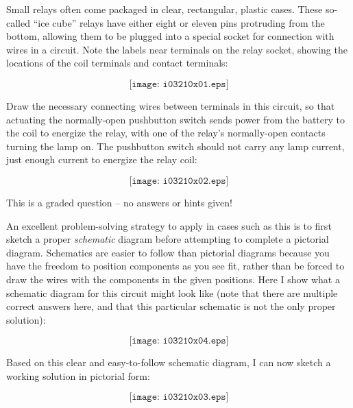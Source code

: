 

Small relays often come packaged in clear, rectangular, plastic cases.  These so-called ``ice cube'' relays have either eight or eleven pins protruding from the bottom, allowing them to be plugged into a special socket for connection with wires in a circuit.  Note the labels near terminals on the relay socket, showing the locations of the coil terminals and contact terminals:

$$\texttt{[image: i03210x01.eps]}$$

Draw the necessary connecting wires between terminals in this circuit, so that actuating the normally-open pushbutton switch sends power from the battery to the coil to energize the relay, with one of the relay's normally-open contacts turning the lamp on.  The pushbutton switch should not carry any lamp current, just enough current to energize the relay coil:

\vskip 20pt

$$\texttt{[image: i03210x02.eps]}$$

\vfil 

\eject






This is a graded question -- no answers or hints given!
 






An excellent problem-solving strategy to apply in cases such as this is to first sketch a proper {\it schematic} diagram before attempting to complete a pictorial diagram.  Schematics are easier to follow than pictorial diagrams because you have the freedom to position components as you see fit, rather than be forced to draw the wires with the components in the given positions.  Here I show what a schematic diagram for this circuit might look like (note that there are multiple correct answers here, and that this particular schematic is not the only proper solution):

$$\texttt{[image: i03210x04.eps]}$$

\vskip 10pt

Based on this clear and easy-to-follow schematic diagram, I can now sketch a working solution in pictorial form:

$$\texttt{[image: i03210x03.eps]}$$




